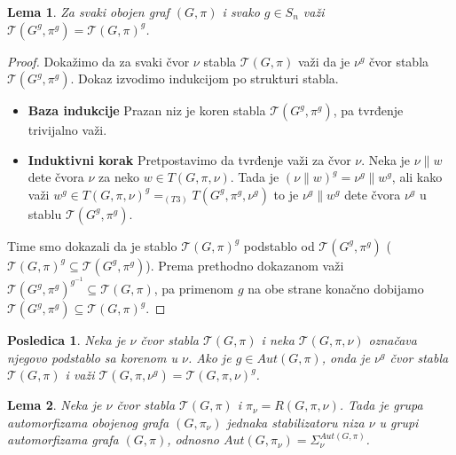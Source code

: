 \documentclass[12pt,oneside]{memoir}
\newtheorem{lemma}{Lema}
\newtheorem{corrolary}{Posledica}
\theoremstyle{definition}
\begin{document}
  \begin{lemma}
      Za svaki obojen graf $(G, \pi)$ i svako $g \in S_n$ važi
      $\mathcal{T}(G^g, \pi^g) = \mathcal{T}(G, \pi)^g$.
  \end{lemma}

  \begin{proof}
      Dokažimo da za svaki čvor $\nu$ stabla $\mathcal{T}(G, \pi)$ važi da je
      $\nu^g$ čvor stabla $\mathcal{T}(G^g, \pi^g)$. Dokaz izvodimo indukcijom
      po strukturi stabla.
      \begin{itemize}
     	 \item[] \textbf{Baza indukcije} Prazan niz je koren stabla
     		 $\mathcal{T}(G^g, \pi^g)$, pa tvrđenje trivijalno važi.
     	 \item[] \textbf{Induktivni korak} Pretpostavimo da tvrđenje važi za
     		 čvor $\nu$. Neka je $\nu \| w$ dete čvora $\nu$ za neko $w \in
     		 T(G, \pi, \nu)$. Tada je $(\nu \| w)^g = \nu^g \| w^g$, ali kako
     		 važi $w^g \in T(G, \pi, \nu)^g =_{(T3)} T(G^g, \pi^g, \nu^g)$
     		 to je $\nu^g \| w^g$ dete čvora $\nu^g$ u stablu $\mathcal{T}(G^g,
     		 \pi^g)$.
      \end{itemize}
      Time smo dokazali da je stablo $\mathcal{T}(G, \pi)^g$ podstablo od
      $\mathcal{T}(G^g, \pi^g)$ ($\mathcal{T}(G, \pi)^g \subseteq
      \mathcal{T}(G^g, \pi^g)$). Prema prethodno dokazanom važi
      $\mathcal{T}(G^g, \pi^g)^{g^{-1}} \subseteq \mathcal{T}(G, \pi)$, pa
      primenom $g$ na obe strane konačno dobijamo $\mathcal{T}(G^g, \pi^g)
      \subseteq \mathcal{T}(G, \pi)^g$.
  \end{proof}

  \begin{corrolary}
	  \label{corr:auttree}
      Neka je $\nu$ čvor stabla $\mathcal{T}(G, \pi)$ i neka $\mathcal{T}(G,
      \pi, \nu)$ označava njegovo podstablo sa korenom u $\nu$. Ako je $g
      \in Aut(G, \pi)$, onda je $\nu^g$ čvor stabla $\mathcal{T}(G, \pi)$ i
      važi $\mathcal{T}(G, \pi, \nu^g) = \mathcal{T}(G, \pi, \nu)^g$.
  \end{corrolary}

  \begin{lemma}
	  Neka je $\nu$ čvor stabla $\mathcal{T}(G, \pi)$ i $\pi_\nu = R(G, \pi,
	  \nu)$. Tada je grupa automorfizama obojenog grafa $(G, \pi_\nu)$ jednaka
	  stabilizatoru niza $\nu$ u grupi automorfizama grafa $(G, \pi)$, odnosno
	  $Aut(G, \pi_\nu) = \Sigma_\nu^{Aut(G, \pi)}$.
  \end{lemma}
\end{document}
